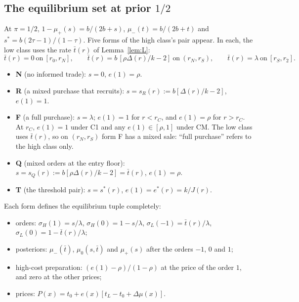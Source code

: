 \documentclass[11pt]{article}
\theoremstyle{definition}
\begin{document}
\subsection{The equilibrium set at prior $1/2$}

At $\pi=1/2$, $1-\mu_+(s)=b/(2b+s)$, $\mu_-(t)=b/(2b+t)$ and $s^*=b(2\tau-1)/(1-\tau)$. Five forms of the high
class's pair appear. In each, the low class uses the rate $\bar t(r)$ of Lemma~\ref{lem:L}:
\[
\bar t(r)=0\ \text{on}\ [r_0,r_N],\qquad \bar t(r)=b\,[\rho\Delta(r)/k-2]\ \text{on}\ (r_N,r_S),\qquad \bar t(r)=\lambda\ \text{on}\ [r_S,r_2].
\]
\begin{itemize}
\item \textbf{N} (no informed trade): $s=0$, $e(1)=\rho$.
\item \textbf{R} (a mixed purchase that recruits): $s=s_R(r):=b[\Delta(r)/k-2]$, $e(1)=1$.
\item \textbf{F} (a full purchase): $s=\lambda$; $e(1)=1$ for $r<r_C$, and $e(1)=\rho$ for $r>r_C$. At $r_C$,
  $e(1)=1$ under C1 and any $e(1)\in[\rho,1]$ under CM. The low class uses $\bar t(r)$, so on $(r_N,r_S)$ form F
  has a mixed sale: ``full purchase'' refers to the high class only.
\item \textbf{Q} (mixed orders at the entry floor): $s=s_Q(r):=b[\rho\Delta(r)/k-2]=\bar t(r)$, $e(1)=\rho$.
\item \textbf{T} (the threshold pair): $s=s^*(r)$, $e(1)=e^*(r)=k/J(r)$.
\end{itemize}
Each form defines the equilibrium tuple completely:
\begin{itemize}
\item orders: $\sigma_H(1)=s/\lambda$, $\sigma_H(0)=1-s/\lambda$, $\sigma_L(-1)=\bar t(r)/\lambda$, $\sigma_L(0)=1-\bar t(r)/\lambda$;
\item posteriors: $\mu_-(\bar t)$, $\mu_0(s,\bar t)$ and $\mu_+(s)$ after the orders $-1$, $0$ and $1$;
\item high-cost preparation: $(e(1)-\rho)/(1-\rho)$ at the price of the order $1$, and zero at the other prices;
\item prices: $P(x)=t_0+e(x)[t_L-t_0+\Delta\mu(x)]$.
\end{itemize}
\end{document}

